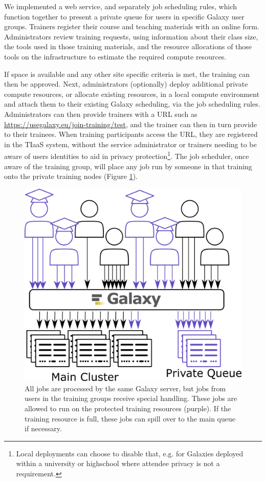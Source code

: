 \documentclass[a4paper,num-refs]{oup-contemporary}
\begin{document}
We implemented a web service, and separately job scheduling rules, which function together to present a private queue for users in specific Galaxy user groups. Trainers register their course and teaching materials with an online form. Administrators review training requests, using information about their class size, the tools used in those training materials, and the resource allocations of those tools on the infrastructure to estimate the required compute resources.

If space is available and any other site specific criteria is met, the training can then be approved. Next, administrators (optionally) deploy additional private compute resources, or allocate existing resources, in a local compute environment and attach them to their existing Galaxy scheduling, via the job scheduling rules. Administrators can then provide trainers with a URL such as \url{https://usegalaxy.eu/join-training/test}, and the trainer can then in turn provide to their trainees. When training participants access the URL, they are registered in the TIaaS system, without the service administrator or trainers needing to be aware of users identities to aid in privacy protection\footnote{Local deployments can choose to disable that, e.g. for Galaxies deployed within a university or highschool where attendee privacy is not a requirement.}. The job scheduler, once aware of the training group, will place any job run by someone in that training onto the private training nodes (Figure \ref{figure:queue}).

\begin{figure}[bt!]
\centering
\includegraphics[width=\linewidth]{images/rules.png}
\caption{All jobs are processed by the same Galaxy server, but jobs from users in the training groups receive special handling. These jobs are allowed to run on the protected training resources (purple). If the training resource is full, these jobs can spill over to the main queue if necessary.}\label{figure:queue}
\end{figure}
\end{document}
